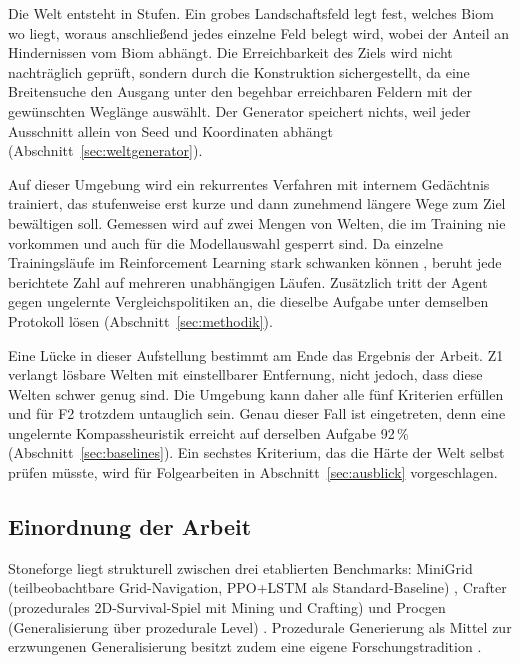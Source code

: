 \documentclass[11pt,a4paper]{article}
\begin{document}
Die Welt entsteht in Stufen. Ein grobes Landschaftsfeld legt fest, welches Biom
wo liegt, woraus anschließend jedes einzelne Feld belegt wird, wobei der Anteil
an Hindernissen vom Biom abhängt. Die Erreichbarkeit des Ziels wird nicht
nachträglich geprüft, sondern durch die Konstruktion sichergestellt, da eine
Breitensuche den Ausgang unter den begehbar erreichbaren Feldern mit der
gewünschten Weglänge auswählt. Der Generator speichert nichts, weil jeder
Ausschnitt allein von Seed und Koordinaten abhängt
(Abschnitt~\ref{sec:weltgenerator}).

Auf dieser Umgebung wird ein rekurrentes Verfahren mit internem Gedächtnis
trainiert, das stufenweise erst kurze und dann zunehmend längere Wege zum Ziel
bewältigen soll. Gemessen wird auf zwei Mengen von Welten, die im Training nie
vorkommen und auch für die Modellauswahl gesperrt sind. Da einzelne
Trainingsläufe im Reinforcement Learning stark schwanken können
\cite{henderson2018matters}, beruht jede berichtete Zahl auf mehreren
unabhängigen Läufen. Zusätzlich tritt der Agent gegen ungelernte
Vergleichspolitiken an, die dieselbe Aufgabe unter demselben Protokoll lösen
(Abschnitt~\ref{sec:methodik}).

Eine Lücke in dieser Aufstellung bestimmt am Ende das Ergebnis der Arbeit. Z1
verlangt lösbare Welten mit einstellbarer Entfernung, nicht jedoch, dass diese
Welten schwer genug sind. Die Umgebung kann daher alle fünf Kriterien erfüllen
und für F2 trotzdem untauglich sein. Genau dieser Fall ist eingetreten, denn
eine ungelernte Kompassheuristik erreicht auf derselben Aufgabe 92\,\%
(Abschnitt~\ref{sec:baselines}). Ein sechstes Kriterium, das die Härte der Welt
selbst prüfen müsste, wird für Folgearbeiten in Abschnitt~\ref{sec:ausblick}
vorgeschlagen.

\subsection{Einordnung der Arbeit}
\label{sec:relatedwork}

Stoneforge liegt strukturell zwischen drei etablierten Benchmarks: MiniGrid
(teilbeobachtbare Grid-Navigation, PPO+LSTM als Standard-Baseline)
\cite{chevalier2023minigrid}, Crafter (prozedurales 2D-Survival-Spiel mit
Mining und Crafting) \cite{hafner2021crafter} und Procgen (Generalisierung
über prozedurale Level) \cite{cobbe2020procgen}. Prozedurale Generierung als
Mittel zur erzwungenen Generalisierung besitzt zudem eine eigene
Forschungstradition \cite{togelius2011search, risi2020increasing}.
\end{document}
